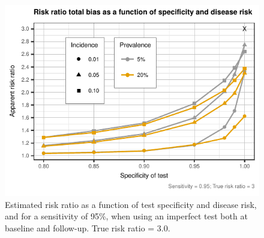 \documentclass[utf8]{frontiersSCNS}\usepackage[]{graphicx}\usepackage[]{color}
\begin{document}
\begin{figure}[htbp]
  \begin{center}
    \includegraphics[scale=.95]{master-RR_Se_PrInc-1}
    \end{center}
  \caption{Estimated risk ratio as a function of test specificity and disease
    risk, and for a sensitivity of 95\%, when using an imperfect test both at
    baseline and follow-up. True risk ratio = \(3.0\).}
  \label{fig:apparent_RR}
\end{figure}

\end{document}
